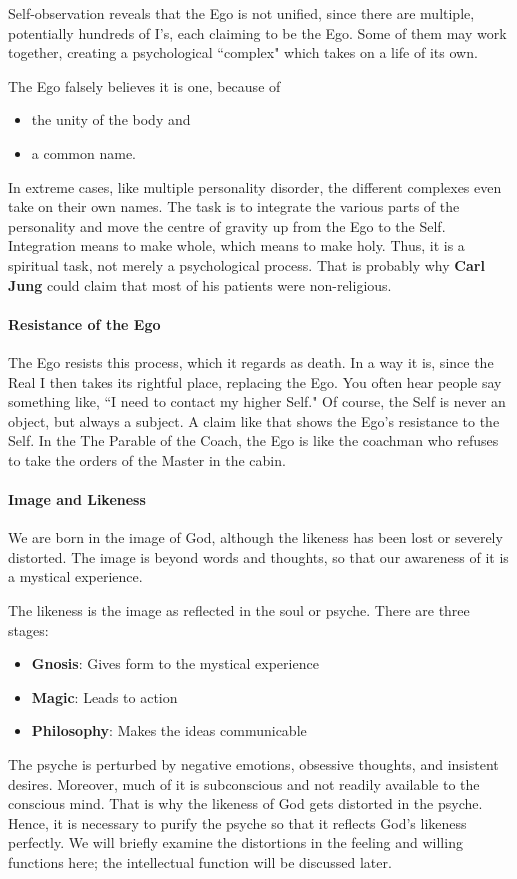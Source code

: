 Self-observation reveals that the Ego is not unified, since there are multiple, potentially hundreds of I's, each claiming to be the Ego. Some of them may work together, creating a psychological ``complex" which takes on a life of its own.

The Ego falsely believes it is one, because of

\begin{itemize}
\item the unity of the body and 
\item a common name. 
\end{itemize}
In extreme cases, like multiple personality disorder, the different complexes even take on their own names. The task is to integrate the various parts of the personality and move the centre of gravity up from the Ego to the Self. Integration means to make whole, which means to make holy. Thus, it is a spiritual task, not merely a psychological process. That is probably why \textbf{Carl Jung} could claim that most of his patients were non-religious.

\paragraph{Resistance of the Ego}
The Ego resists this process, which it regards as death. In a way it is, since the Real I then takes its rightful place, replacing the Ego. You often hear people say something like, ``I need to contact my higher Self." Of course, the Self is never an object, but always a subject. A claim like that shows the Ego's resistance to the Self. In the The Parable of the Coach, the Ego is like the coachman who refuses to take the orders of the Master in the cabin.

\paragraph{Image and Likeness}
We are born in the image of God, although the likeness has been lost or severely distorted. The image is beyond words and thoughts, so that our awareness of it is a mystical experience.

The likeness is the image as reflected in the soul or psyche. There are three stages:

\begin{itemize}
\item \textbf{Gnosis}: Gives form to the mystical experience 
\item \textbf{Magic}: Leads to action 
\item \textbf{Philosophy}: Makes the ideas communicable 
\end{itemize}
The psyche is perturbed by negative emotions, obsessive thoughts, and insistent desires. Moreover, much of it is subconscious and not readily available to the conscious mind. That is why the likeness of God gets distorted in the psyche. Hence, it is necessary to purify the psyche so that it reflects God's likeness perfectly. We will briefly examine the distortions in the feeling and willing functions here; the intellectual function will be discussed later.

